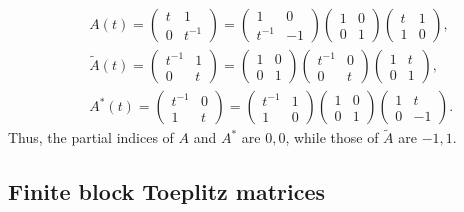 \documentclass[addpoints,12pt,letter]{article}
\newcommand{\ti}{\tilde}
\numberwithin{equation}{section}
\theoremstyle{definition}
\begin{document}
\begin{eqnarray*}
& & A(t)=\begin{pmatrix} t & 1\\ 0 & t^{-1}\end{pmatrix}=
\begin{pmatrix} 1 & 0\\ t^{-1} &-1\end{pmatrix}\begin{pmatrix} 1 & 0\\ 0 & 1\end{pmatrix}\begin{pmatrix} t & 1\\ 1 & 0\end{pmatrix},\\
& & \ti{A}(t)=\begin{pmatrix} t^{-1} & 1\\ 0 & t\end{pmatrix}=
\begin{pmatrix} 1 & 0\\ 0 & 1\end{pmatrix}\begin{pmatrix} t^{-1} & 0\\ 0 & t\end{pmatrix}\begin{pmatrix} 1 & t\\ 0 & 1\end{pmatrix},\\
& & A^{\ast}(t)=\begin{pmatrix} t^{-1} & 0\\ 1 & t\end{pmatrix}=
\begin{pmatrix} t^{-1} & 1\\ 1 & 0\end{pmatrix}\begin{pmatrix} 1 & 0\\ 0 & 1\end{pmatrix}\begin{pmatrix} 1 & t\\ 0 &-1\end{pmatrix}.
\end{eqnarray*}
Thus, the partial indices of $A$ and $A^{\ast}$ are $0,0$, while those of $\ti{A}$ are $-1,1$.

\subsection{Finite block Toeplitz matrices}\label{ssec:prelim2}
\end{document}
